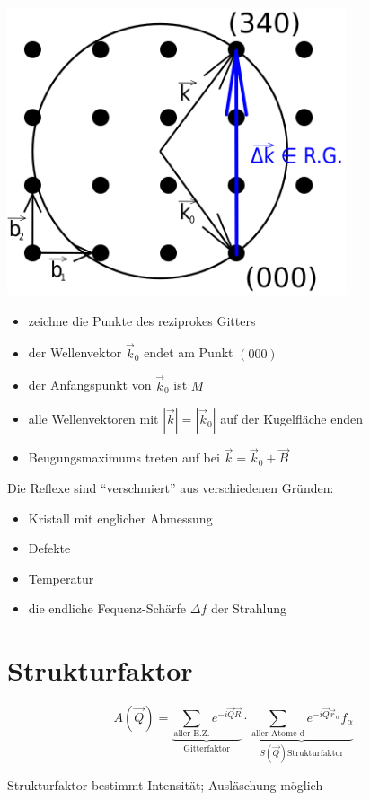 \includegraphics[width=0.75\textwidth]{kap03_04.png}


\begin{itemize}
\item zeichne die Punkte des reziprokes Gitters
\item der Wellenvektor \(\vec k_0\) endet am Punkt \((000)\)
\item der Anfangspunkt von \(\vec k_0\) ist \(M\)
\item alle Wellenvektoren mit \(|\vec k|= |\vec k_0|\) auf der
  Kugelfläche enden
\item Beugungsmaximums treten auf bei \(\vec k= \vec k_0 +\vec B\)
\end{itemize}

Die Reflexe sind ``verschmiert'' aus verschiedenen Gründen:
\begin{itemize}
\item Kristall mit englicher Abmessung
\item Defekte
\item Temperatur
\item die endliche Fequenz-Schärfe \(\Delta f\) der Strahlung
\end{itemize}

\section{Strukturfaktor}

\[  A(\vec Q)= \underbrace{\sum_{\text{aller E.Z.}}e^{-i\vec Q\vec
  R}}_{\text{Gitterfaktor}}\cdot \underbrace{\sum_{\text{aller Atome d}}e^{-i\vec Q\vec r_{\alpha}} f_{\alpha}}_{S(\vec Q) \text{Strukturfaktor}}
\]


Strukturfaktor bestimmt Intensität; Ausläschung möglich

